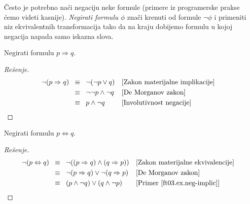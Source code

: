 \medskip

\v Cesto je potrebno na\'ci negaciju neke formule (primere iz programerske prakse \'cemo videti kasnije).
\emph{Negirati formulu $\phi$} zna\v ci krenuti od formule $\lnot \phi$ i primeniti niz ekvivalentnih
transformacija tako da na kraju dobijemo formulu u kojoj negacija napada samo iskazna slova.

\begin{EX}\label{ft03.ex.neg-implic}
  Negirati formulu $p \Rightarrow q$.
\end{EX}
\begin{proof}[Re\v senje]
  \begin{align*}
    \lnot(p \Rightarrow q)
    &\;\;\equiv\;\; \lnot(\lnot p \lor q)       && \text{[Zakon materijalne implikacije]}\\
    &\;\;\equiv\;\; \lnot\lnot p \land \lnot q  && \text{[De Morganov zakon]}\\
    &\;\;\equiv\;\; p \land \lnot q             && \text{[Involutivnost negacije] }\qedhere
  \end{align*}
\end{proof}

\begin{EX}\label{ft03.ex.neg-ekviv}
  Negirati formulu $p \Leftrightarrow q$.
\end{EX}
\begin{proof}[Re\v senje]
  \begin{align*}
    \lnot(p \Leftrightarrow q)
    &\;\;\equiv\;\; \lnot((p \Rightarrow q) \land (q \Rightarrow p))    && \text{[Zakon materijalne ekvivalencije]}\\
    &\;\;\equiv\;\; \lnot(p \Rightarrow q) \lor \lnot(q \Rightarrow p)  && \text{[De Morganov zakon]}\\
    &\;\;\equiv\;\; (p \land \lnot q) \lor (q \land \lnot p)            && \text{[Primer~\ref{ft03.ex.neg-implic}]}\qedhere
  \end{align*}
\end{proof}


